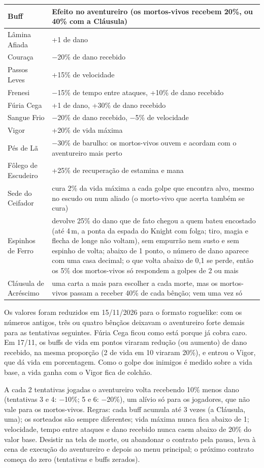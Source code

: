 \documentclass[11pt,a4paper]{article}
\begin{document}
\begin{xltabular}{\textwidth}{@{}lX@{}}
\toprule
\textbf{Buff} & \textbf{Efeito no aventureiro (os mortos-vivos recebem 20\%, ou 40\% com a Cláusula)} \\
\midrule
Lâmina Afiada & +1 de dano \\
Couraça & $-$20\% de dano recebido \\
Passos Leves & +15\% de velocidade \\
Frenesi & $-$15\% de tempo entre ataques, +10\% de dano recebido \\
Fúria Cega & +1 de dano, +30\% de dano recebido \\
Sangue Frio & $-$20\% de dano recebido, $-$5\% de velocidade \\
Vigor & +20\% de vida máxima \\
Pés de Lã & $-$30\% de barulho: os mortos-vivos ouvem e acordam com o aventureiro mais perto \\
Fôlego de Escudeiro & +25\% de recuperação de estamina e mana \\
Sede do Ceifador & cura 2\% da vida máxima a cada golpe que encontra alvo, mesmo no escudo ou num aliado (o morto-vivo que acerta também se cura) \\
Espinhos de Ferro & devolve 25\% do dano que de fato chegou a quem bateu encostado (até 4\,m, a ponta da espada do Knight com folga; tiro, magia e flecha de longe não voltam), sem empurrão nem susto e sem espinho de volta; abaixo de 1 ponto, o número de dano aparece com uma casa decimal; o que volta abaixo de 0,1 se perde, então os 5\% dos mortos-vivos só respondem a golpes de 2 ou mais \\
Cláusula de Acréscimo & uma carta a mais para escolher a cada morte, mas os mortos-vivos passam a receber 40\% de cada bênção; vem uma vez só \\
\bottomrule
\end{xltabular}

Os valores foram reduzidos em 15/11/2026 para o formato roguelike: com os números antigos, três ou quatro bênçãos deixavam o aventureiro forte demais para as tentativas seguintes. Fúria Cega ficou como está porque já cobra caro. Em 17/11, os buffs de vida em pontos viraram redução (ou aumento) de dano recebido, na mesma proporção (2 de vida em 10 viraram 20\%), e entrou o Vigor, que dá vida em porcentagem. Como o golpe dos inimigos é medido sobre a vida base, a vida ganha com o Vigor fica de colchão.

A cada 2 tentativas jogadas o aventureiro volta recebendo 10\% menos dano (tentativas 3 e 4: $-$10\%; 5 e 6: $-$20\%), um alívio só para os jogadores, que não vale para os mortos-vivos. Regras: cada buff acumula até 3 vezes (a Cláusula, uma); os sorteados são sempre diferentes; vida máxima nunca fica abaixo de 1; velocidade, tempo entre ataques e dano recebido nunca caem abaixo de 20\% do valor base. Desistir na tela de morte, ou abandonar o contrato pela pausa, leva à cena de execução do aventureiro e depois ao menu principal; o próximo contrato começa do zero (tentativas e buffs zerados).
\end{document}
